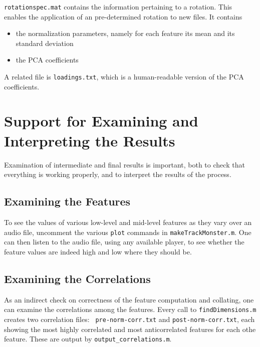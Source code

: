 \documentclass[11pt]{article}
\begin{document}
{\tt rotationspec.mat}  contains the information pertaining to a
rotation.  This enables the application of an pre-determined rotation 
to new files.  It contains 

\begin{itemize}  \setlength{\itemsep}{0pt}\setlength{\parskip}{0pt}
\item the normalization parameters, namely for each feature its mean
  and its standard deviation

\item the PCA coefficients
\end{itemize}

A related file is {\tt loadings.txt}, which is a human-readable
version of the PCA coefficients.


\section{Support for Examining and Interpreting the Results}

Examination of intermediate and final results is important, both to
check that everything is working properly, and to interpret the
results of the process.

\subsection{Examining the Features}

To see the values of various low-level and mid-level features as they
vary over an audio file, uncomment the various {\tt plot} commands in
{\tt makeTrackMonster.m}.  One can then listen to the audio file,
using any available player, to see whether the feature values are
indeed high and low where they should be.

\subsection{Examining the Correlations}

As an indirect check on correctness of the feature computation and
collating, one can examine the correlations among the features.  Every
call to {\tt findDimensions.m} creates two correlation files: {\tt
  pre-norm-corr.txt} and {\tt post-norm-corr.txt}, each showing the
most highly correlated and most anticorrelated features for each othe
feature.  These are output by {\tt output\_correlations.m}.
\end{document}
